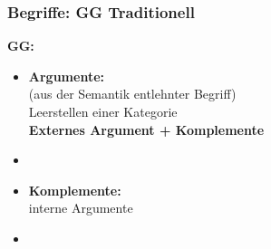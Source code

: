 \begin{frame}
\frametitle{Begriffe: GG \vs Traditionell}

	\begin{minipage}[b]{0.47\textwidth}
		\footnotesize
	\textbf{GG:}
		\begin{itemize}
		\item \alert{\textbf{Argumente:}}\\
		(aus der Semantik entlehnter Begriff)\\
		Leerstellen einer Kategorie \\
		\ras \textbf{Externes Argument + Komplemente}
		\item[]	
		\item \textbf{Komplemente:}\\
		\ras interne Argumente
		\item[]
		\end{itemize}	
  	\end{minipage}  
	\begin{minipage}[b]{0.5\textwidth}
		\begin{figure}
	\centering
\end{figure}
  	\end{minipage}

\end{frame}

